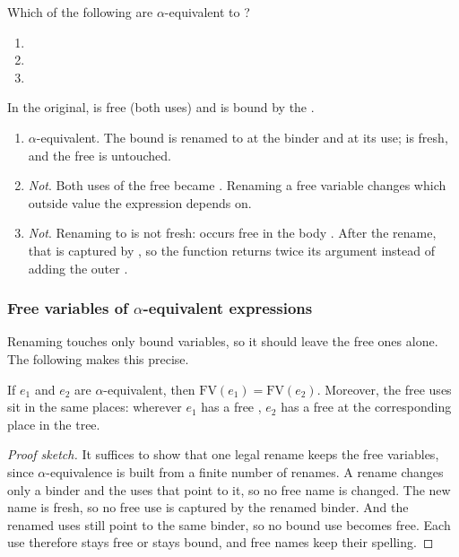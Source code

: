\begin{exercise}
Which of the following are $\alpha$-equivalent to ?
\begin{enumerate}[label=(\Alph*)]
  \item {}
  \item {}
  \item {}
\end{enumerate}
\end{exercise}
\begin{solution}
In the original,  is free (both uses) and  is bound by the .
\begin{enumerate}[label=(\Alph*)]
  \item $\alpha$-equivalent. The bound  is renamed to  at the binder and at its use;  is fresh, and the free  is untouched.
  \item \emph{Not}. Both uses of the free  became . Renaming a free variable changes which outside value the expression depends on.
  \item \emph{Not}. Renaming  to  is not fresh:  occurs free in the body . After the rename, that  is captured by , so the function returns twice its argument instead of adding the outer .
\end{enumerate}
\end{solution}

\subsubsection{Free variables of $\alpha$-equivalent expressions} Renaming touches only bound variables, so it should leave the free ones alone. The following makes this precise.

\begin{theorem}
If $e_1$ and $e_2$ are $\alpha$-equivalent, then $\mathrm{FV}(e_1) = \mathrm{FV}(e_2)$. Moreover, the free uses sit in the same places: wherever $e_1$ has a free , $e_2$ has a free  at the corresponding place in the tree.
\end{theorem}
\begin{proof}[Proof sketch]
It suffices to show that one legal rename keeps the free variables, since $\alpha$-equivalence is built from a finite number of renames. A rename changes only a binder and the uses that point to it, so no free name is changed. The new name is fresh, so no free use is captured by the renamed binder. And the renamed uses still point to the same binder, so no bound use becomes free. Each use therefore stays free or stays bound, and free names keep their spelling.
\end{proof}

